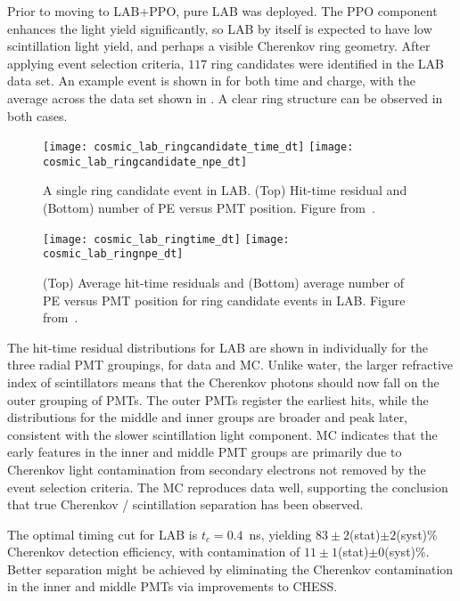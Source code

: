 Prior to moving to LAB+PPO, pure LAB was deployed. 
The PPO component enhances the light yield significantly, so LAB by itself is expected to have low scintillation light yield, and perhaps a visible Cherenkov ring geometry.
After applying event selection criteria, $117$ ring candidates were identified in the LAB data set. 
An example event is shown in  for both time and charge, with the average across the data set shown in . 
A clear ring structure can be observed in both cases. 

\begin{figure}
	\centering
	\texttt{[image: cosmic\_lab\_ringcandidate\_time\_dt]}
	\texttt{[image: cosmic\_lab\_ringcandidate\_npe\_dt]}
	\caption{A single ring candidate event in LAB. (Top) Hit-time residual and (Bottom) number of PE versus PMT position. Figure from~\cite{chess_lab}.}
	\label{fig:lab_ring}
\end{figure}

\begin{figure}
	\centering
	\texttt{[image: cosmic\_lab\_ringtime\_dt]}
	\texttt{[image: cosmic\_lab\_ringnpe\_dt]}
	\caption{(Top) Average hit-time residuals and (Bottom) average number of PE versus PMT position for ring candidate events in LAB. Figure from~\cite{chess_lab}.}
	\label{fig:lab2}
\end{figure}


The hit-time residual distributions for LAB are shown in  individually for the three radial PMT groupings, for data and MC. 
Unlike water, the larger refractive index of scintillators means that the Cherenkov photons should now fall on the outer grouping of PMTs.
The outer PMTs register the earliest hits, while the distributions for the middle and inner groups are broader and peak later, consistent with the slower scintillation light component. 
MC indicates that the early features in the inner and middle PMT groups are primarily due to Cherenkov light contamination from secondary electrons not removed by the event selection criteria.
The MC reproduces data well, supporting the conclusion that true Cherenkov / scintillation separation has been observed. 

The optimal timing cut for LAB is $ t_c = 0.4$~ns,  yielding $83\pm2$(stat)$\pm2$(syst)\% Cherenkov detection efficiency, with contamination of $11\pm1$(stat)$\pm0$(syst)\%. 
Better separation might be achieved by eliminating the Cherenkov contamination in the inner and middle PMTs via improvements to CHESS.


